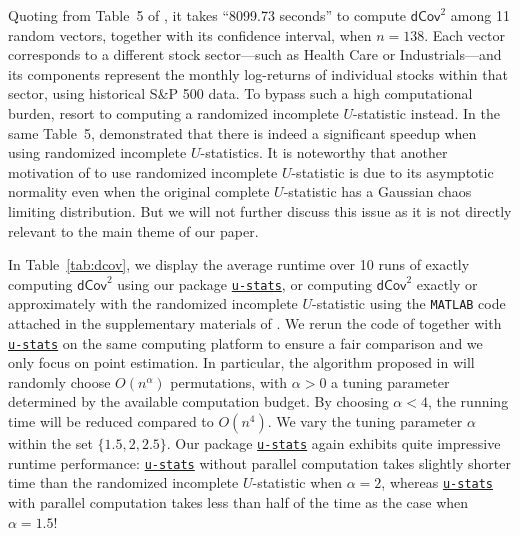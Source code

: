 \documentclass[twoside,11pt]{article}
\newcommand{\Lin}[1]{{\color{purple}{Lin: #1}}}
\newcommand{\Zhang}[1]{{\color{blue}{Zhang: #1}}}
\newcommand{\libref}[2]{\href{#2}{\texttt{#1}}}
\def\package{\libref{u-stats}{https://github.com/zrq1706/U-Statistics-python}}
\begin{document}
Quoting from Table~5 of \citet{shao2025u}, it takes ``8099.73 seconds'' to compute $\mathsf{dCov}^2$ among 11 random vectors, together with its confidence interval, when $n = 138$. Each vector corresponds to a different stock sector—such as Health Care or Industrials—and its components represent the monthly log-returns of individual stocks within that sector, using historical S\&P 500 data. To bypass such a high computational burden, \citet{shao2025u} resort to computing a randomized incomplete $U$-statistic instead. In the same Table~5, \citet{shao2025u} demonstrated that there is indeed a significant speedup when using randomized incomplete $U$-statistics. It is noteworthy that another motivation of \citet{shao2025u} to use randomized incomplete $U$-statistic is due to its asymptotic normality \citep{chen2019randomized} even when the original complete $U$-statistic has a Gaussian chaos limiting distribution. But we will not further discuss this issue as it is not directly relevant to the main theme of our paper.

In Table~\ref{tab:dcov}, we display the average runtime over 10 runs of exactly computing $\mathsf{dCov}^2$ using our package \package{}, or computing $\mathsf{dCov}^2$ exactly or approximately with the randomized incomplete $U$-statistic using the \texttt{MATLAB} code attached in the supplementary materials of \citet{shao2025u}. We rerun the code of \citet{shao2025u} together with \package{} on the same computing platform to ensure a fair comparison and we only focus on point estimation. In particular, the algorithm proposed in \citet{shao2025u} will randomly choose $O (n^\alpha)$ %
permutations, with $\alpha > 0$ a tuning parameter determined by the available computation budget. By choosing $\alpha < 4$, the running time will be reduced compared to $O (n^{4})$. We vary the tuning parameter $\alpha$ within the set $\{1.5, 2, 2.5\}$. Our package \package{} again exhibits quite impressive runtime performance: \package{} without parallel computation takes slightly shorter time than the randomized incomplete $U$-statistic when $\alpha = 2$, whereas \package{} with parallel computation takes less than half of the time as the case when $\alpha = 1.5$!


\end{document}
